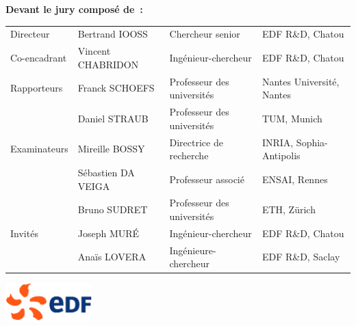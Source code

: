 {\begin{adjustwidth}{-8mm}{-8mm}
\noindent
\textbf{Devant le jury composé de~:}\\
\begin{tabular}{llll}
  Directeur       & Bertrand IOOSS      & Chercheur senior & EDF R\&D, Chatou \\
  Co-encadrant    & Vincent CHABRIDON   & Ingénieur-chercheur        & EDF R\&D, Chatou \\
  Rapporteurs     & Franck SCHOEFS      & Professeur des universités & Nantes Université, Nantes\\
                  & Daniel STRAUB       & Professeur des universités & TUM, Munich\\
  Examinateurs    & Mireille BOSSY      & Directrice de recherche    & INRIA, Sophia-Antipolis\\
                  & Sébastien DA VEIGA  & Professeur associé         & ENSAI, Rennes\\
                  & Bruno SUDRET        & Professeur des universités & ETH, Z\"urich \\ 
  Invités         & Joseph MUR\'E       & Ingénieur-chercheur        & EDF R\&D, Chatou \\
                  & Ana\"is LOVERA      & Ingénieure-chercheur       & EDF R\&D, Saclay\\
\end{tabular}
\end{adjustwidth}

\vfill
\begin{center}
  \includegraphics[width=0.25\textwidth]{classes/logo_EDF.png}
\end{center}
}